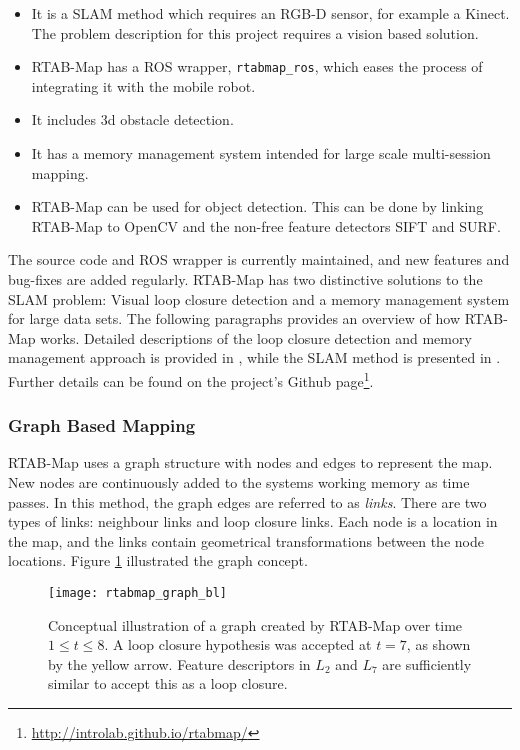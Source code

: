 \begin{itemize}
	\item It is a \ac{SLAM} method which requires an RGB-D sensor, for example a Kinect. The problem description for this project requires a vision based solution.
	\item \ac{RTAB-Map} has a \ac{ROS} wrapper, \texttt{rtabmap\_ros}, which eases the process of integrating it with the mobile robot.
	\item It includes 3d obstacle detection.
	\item It has a memory management system intended for large scale multi-session mapping.
	\item \ac{RTAB-Map} can be used for object detection. This can be done by linking \ac{RTAB-Map} to OpenCV and the non-free feature detectors \ac{SIFT} and \ac{SURF}.
\end{itemize}

The source code and \ac{ROS} wrapper is currently maintained, and new features and bug-fixes are added regularly. \ac{RTAB-Map} has two distinctive solutions to the \ac{SLAM} problem: Visual loop closure detection and a memory management system for large data sets. The following paragraphs provides an overview of how \ac{RTAB-Map} works. Detailed descriptions of the loop closure detection and memory management approach is provided in  \cite{labbe13appearance}, while the \ac{SLAM} method is presented in \cite{labbe14online}. Further details can be found on the project's Github page\footnote{\url{http://introlab.github.io/rtabmap/}}.

\subsubsection{Graph Based Mapping}

\ac{RTAB-Map} uses a graph structure with nodes and edges to represent the map. New nodes are continuously added to the systems working memory as time passes. In this method, the graph edges are referred to as \textit{links}. There are two types of links: neighbour links and loop closure links. Each node is a location in the map, and the links contain geometrical transformations between the node locations. Figure \ref{fig:rtabmap_graph} illustrated the graph concept.

\begin{figure}[p]
    \centering
    \texttt{[image: rtabmap\_graph\_bl]}
    \caption{Conceptual illustration of a graph created by \ac{RTAB-Map} over time $1 \leq t \leq 8 $. A loop closure hypothesis was accepted at $t=7$, as shown by the yellow arrow. Feature descriptors in $L_2$ and $L_7$ are sufficiently similar to accept this as a loop closure.}
    \label{fig:rtabmap_graph}
\end{figure}

